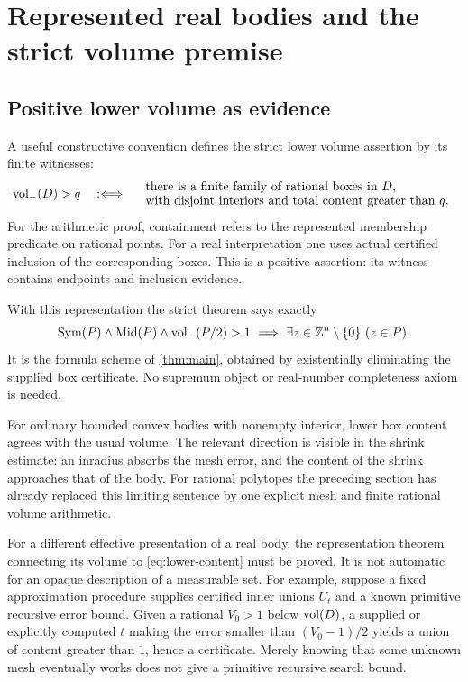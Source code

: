 \section{Represented real bodies and the strict volume premise}\label{sec:real}

\subsection{Positive lower volume as evidence}

A useful constructive convention defines the strict lower
volume assertion by its finite witnesses:
\begin{equation}\label{eq:lower-content}
 \operatorname{vol}_-(D)>q
 \quad:\Longleftrightarrow\quad
 \begin{array}{l}
 \text{there is a finite family of rational boxes in \(D\),}\\[-.1em]
 \text{with disjoint interiors and total content greater than \(q\).}
 \end{array}
\end{equation}
For the arithmetic proof, containment refers to the
represented membership predicate on rational points.
For a real interpretation one uses actual certified
inclusion of the corresponding boxes.
This is a positive assertion: its witness contains
endpoints and inclusion evidence.

With this representation the strict theorem says exactly
\[
 \operatorname{Sym}(P)\wedge\operatorname{Mid}(P)\wedge\operatorname{vol}_-(P/2)>1
 \ \Longrightarrow\
 \exists z\in\mathbb Z^n\setminus\{0\}\ (z\in P).
\]
It is the formula scheme of \cref{thm:main}, obtained by
existentially eliminating the supplied box certificate.
No supremum object or real-number completeness axiom
is needed.

For ordinary bounded convex bodies with nonempty interior,
lower box content agrees with the usual volume. The
relevant direction is visible in the shrink estimate:
an inradius absorbs the mesh error, and the content of
the shrink approaches that of the body. For rational
polytopes the preceding section has already replaced
this limiting sentence by one explicit mesh and finite
rational volume arithmetic.

For a different effective presentation of a real body,
the representation theorem connecting its volume to
\cref{eq:lower-content} must be proved. It is not
automatic for an opaque description of a measurable set.
For example, suppose a fixed approximation procedure
supplies certified inner unions \(U_t\) and a known
primitive recursive error bound. Given a rational
\(V_0>1\) below \(\operatorname{vol}(D)\), a supplied or explicitly
computed \(t\) making the error smaller than
\((V_0-1)/2\) yields a union of content greater than
\(1\), hence a certificate. Merely knowing that some
unknown mesh eventually works does not give a
primitive recursive search bound.

